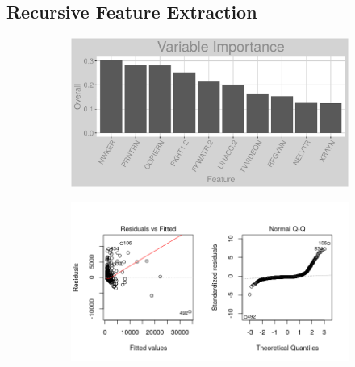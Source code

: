 \subsection{Recursive Feature Extraction}
\label{appendix:fuel_oil:rfe}
\begin{figure}[h]
\centering
\begin{subfigure}{1\textwidth}
\centering
\includegraphics[width=.99\textwidth, height=0.3\textheight]{Images/fuel_oil_rfe_vars.png}
\end{subfigure}
\begin{subfigure}{1\textwidth}
\centering
\includegraphics[width=.99\textwidth, height=0.475\textheight]{Images/fuel_oil_rfe_res_1.png}
\end{subfigure}
\end{figure}
\FloatBarrier
\newpage
